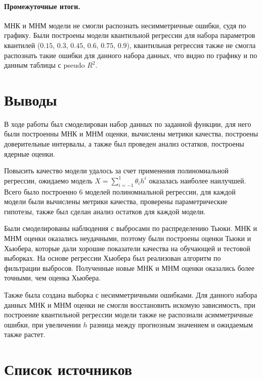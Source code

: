 \documentclass[a4paper,12pt]{article}
\begin{document}
\paragraph{Промежуточные итоги.\\}
МНК и МНМ модели не смогли распознать несимметричные ошибки, судя по графику. Были построены модели квантильной регрессии для набора параметров квантилей ($0.15$, $0.3$, $0.45$, $0.6$, $0.75$, $0.9$), квантильная регрессия также не смогла распознать такие ошибки для данного набора данных, что видно по графику и по данным таблицы с pseudo $R^2$.



\section{Выводы}

В ходе работы был смоделирован набор данных по заданной функции, для него были построенны МНК и МНМ оценки, вычислены метрики качества, построены доверительные интервалы, а также был проведен анализ остатков, построены ядерные оценки.

Повысить качество модели удалось за счет применения полиномиальной регрессии, ожидаемо модель $X=\sum\limits_{i=-1}^1 \theta_i h^i$ оказалась наиболее наилучшей. Всего было построенно 6 моделей полиномиальной регрессии, для каждой модели были вычислены метрики качества, проверены параметрические гипотезы, также был сделан анализ остатков для каждой модели.

Были смоделированы наблюдения с выбросами по распределению Тьюки. МНК и МНМ оценки оказались неудачными, поэтому были построены оценки Тьюки и Хьюбера, которые дали хорошие показатели качества на обучающей и тестовой выборках. На основе регрессии Хьюбера был реализован алгоритм по фильтрации выбросов. Полученные новые МНК и МНМ оценки оказались более точными, чем оценка Хьюбера.

Также была создана выборка с несимметричными ошибками. Для данного набора данных МНК и МНМ оценки не смогли восстановить искомую зависимость, при построение квантильной регрессии модели также не распознали асимметричные ошибки, при увеличении $h$ разница между прогнозным значением и ожидаемым также растет.



\section{Список источников}
\end{document}
